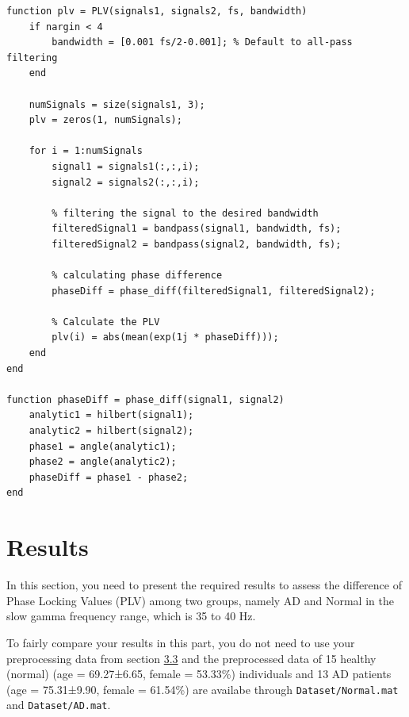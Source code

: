 \documentclass[12pt]{article}
\begin{document}
\begin{lstlisting}[style=matlab-editor]
function plv = PLV(signals1, signals2, fs, bandwidth)
    if nargin < 4
        bandwidth = [0.001 fs/2-0.001]; % Default to all-pass filtering
    end
    
    numSignals = size(signals1, 3);
    plv = zeros(1, numSignals);
    
    for i = 1:numSignals
        signal1 = signals1(:,:,i);
        signal2 = signals2(:,:,i);

        % filtering the signal to the desired bandwidth
        filteredSignal1 = bandpass(signal1, bandwidth, fs);
        filteredSignal2 = bandpass(signal2, bandwidth, fs);
        
        % calculating phase difference
        phaseDiff = phase_diff(filteredSignal1, filteredSignal2);

        % Calculate the PLV
        plv(i) = abs(mean(exp(1j * phaseDiff)));
    end
end

function phaseDiff = phase_diff(signal1, signal2)
    analytic1 = hilbert(signal1);
    analytic2 = hilbert(signal2);
    phase1 = angle(analytic1);
    phase2 = angle(analytic2);
    phaseDiff = phase1 - phase2;
end\end{lstlisting}
\newpage



\section{Results}
\label{sec:sec4}
In this section, you need to present the required results to assess the difference of Phase Locking Values (PLV) among two groups, namely AD and Normal in the slow gamma frequency range, which is 35 to 40 Hz.\par \medskip
To fairly compare your results in this part, you do not need to use your preprocessing data from section \hyperref[sec:sec3.3]{3.3} and the preprocessed data of 15 healthy (normal) (age = 69.27±6.65, female = 53.33\%) individuals and 13 AD patients (age = 75.31±9.90, female = 61.54\%) are availabe through \texttt{Dataset/Normal.mat} and \texttt{Dataset/AD.mat}.\\
\end{document}
